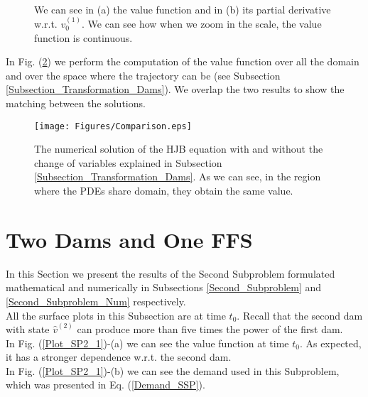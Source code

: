 \begin{figure}[H]
\centering
{}\qquad
{}\\
\caption{We can see in (a) the value function and in (b) its partial derivative w.r.t. $v^{(1)}_0$. We can see how when we zoom in the scale, the value function is continuous.}
\label{Plot_SP1_4}
\end{figure}

In Fig. (\ref{Plot_SP1_5}) we perform the computation of the value function over all the domain and over the space where the trajectory can be (see Subsection \ref{Subsection_Transformation_Dams}). We overlap the two results to show the matching between the solutions.

\begin{figure}[H]
\centering
\texttt{[image: Figures/Comparison.eps]}
\caption{The numerical solution of the HJB equation with and without the change of variables explained in Subsection \ref{Subsection_Transformation_Dams}. As we can see, in the region where the PDEs share domain, they obtain the same value.}
\label{Plot_SP1_5}
\end{figure}

\section{Two Dams and One FFS} \label{Second_Subproblem_Results}

In this Section we present the results of the Second Subproblem formulated mathematical and numerically in Subsections \ref{Second_Subproblem} and \ref{Second_Subproblem_Num} respectively.\\

All the surface plots in this Subsection are at time $t_0$. Recall that the second dam with state $\hat{v}^{(2)}$ can produce more than five times the power of the first dam.\\

In Fig. (\ref{Plot_SP2_1})-(a) we can see the value function at time $t_0$. As expected, it has a stronger dependence w.r.t. the second dam.\\
In Fig. (\ref{Plot_SP2_1})-(b) we can see the demand used in this Subproblem, which was presented in Eq. (\ref{Demand_SSP}).

